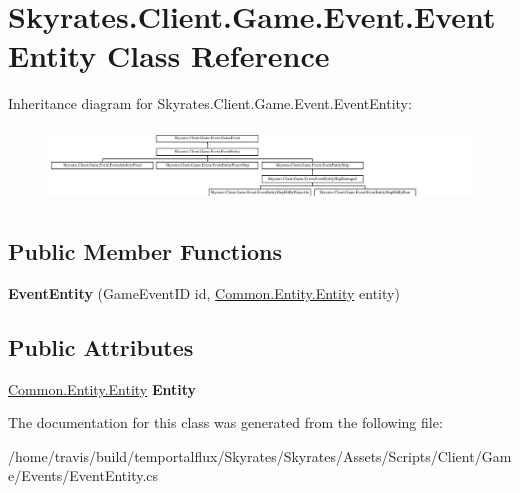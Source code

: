 \hypertarget{class_skyrates_1_1_client_1_1_game_1_1_event_1_1_event_entity}{\section{Skyrates.\-Client.\-Game.\-Event.\-Event\-Entity Class Reference}
\label{class_skyrates_1_1_client_1_1_game_1_1_event_1_1_event_entity}
}
Inheritance diagram for Skyrates.\-Client.\-Game.\-Event.\-Event\-Entity\-:\begin{figure}[H]
\begin{center}
\leavevmode
\includegraphics[height=1.988636cm]{class_skyrates_1_1_client_1_1_game_1_1_event_1_1_event_entity}
\end{center}
\end{figure}
\subsection*{Public Member Functions}
\begin{DoxyCompactItemize}
\item 
\hypertarget{class_skyrates_1_1_client_1_1_game_1_1_event_1_1_event_entity_a8510c0be0f900d65b6b106ca3ad6b5b9}{{\bfseries Event\-Entity} (Game\-Event\-I\-D id, \hyperlink{class_skyrates_1_1_common_1_1_entity_1_1_entity}{Common.\-Entity.\-Entity} entity)}\label{class_skyrates_1_1_client_1_1_game_1_1_event_1_1_event_entity_a8510c0be0f900d65b6b106ca3ad6b5b9}

\end{DoxyCompactItemize}
\subsection*{Public Attributes}
\begin{DoxyCompactItemize}
\item 
\hypertarget{class_skyrates_1_1_client_1_1_game_1_1_event_1_1_event_entity_ac71d6a532f510ff94d9ff1a0407d48f8}{\hyperlink{class_skyrates_1_1_common_1_1_entity_1_1_entity}{Common.\-Entity.\-Entity} {\bfseries Entity}}\label{class_skyrates_1_1_client_1_1_game_1_1_event_1_1_event_entity_ac71d6a532f510ff94d9ff1a0407d48f8}

\end{DoxyCompactItemize}


The documentation for this class was generated from the following file\-:\begin{DoxyCompactItemize}
\item 
/home/travis/build/temportalflux/\-Skyrates/\-Skyrates/\-Assets/\-Scripts/\-Client/\-Game/\-Events/Event\-Entity.\-cs\end{DoxyCompactItemize}
